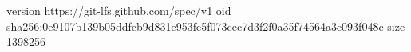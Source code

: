 version https://git-lfs.github.com/spec/v1
oid sha256:0e9107b139b05ddfcb9d831e953fe5f073cec7d3f2f0a35f74564a3e093f048c
size 1398256
